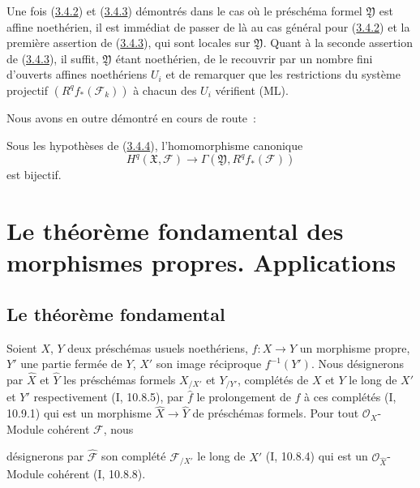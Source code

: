 \begin{env}[3.4.5]
Une fois (\hyperref[III.3.4.2-fr]{3.4.2}) et
(\hyperref[III.3.4.3-fr]{3.4.3}) démontrés dans le cas où le préschéma formel
$\mathfrak Y$ est affine noethérien, il est immédiat de passer de là au cas
général pour (\hyperref[III.3.4.2-fr]{3.4.2}) et la première assertion de
(\hyperref[III.3.4.3-fr]{3.4.3}), qui sont locales sur $\mathfrak Y$. Quant à
la seconde assertion de (\hyperref[III.3.4.3-fr]{3.4.3}), il suffit,
$\mathfrak Y$ étant noethérien, de le recouvrir par un nombre fini d'ouverts
affines noethériens $U_i$ et de remarquer que les restrictions du système
projectif $(R^qf_*(\mathcal F_k))$ à chacun des $U_i$ vérifient (ML).
\end{env}

Nous avons en outre démontré en cours de route~:

\begin{corollary}[3.4.6]
\label{III.3.4.6-fr}
Sous les hypothèses de (\hyperref[III.3.4.4-fr]{3.4.4}), l'homomorphisme
canonique
\[
H^q(\mathfrak X,\mathcal F)
\longrightarrow\Gamma(\mathfrak Y,R^qf_*(\mathcal F))
\tag{3.4.6.1}\label{III.3.4.6.1-fr}
\]
est bijectif.
\end{corollary}

\section{Le théorème fondamental des morphismes propres. Applications}
\label{section:III.4-fr}

\subsection{Le théorème fondamental}
\label{subsection:III.4.1-fr}

\begin{env}[4.1.1]
\label{III.4.1.1-fr}
Soient $X$, $Y$ deux préschémas usuels noethériens, $f:X\to Y$ un
morphisme propre, $Y'$ une partie fermée de $Y$, $X'$ son image réciproque
$f^{-1}(Y')$. Nous désignerons par $\widehat X$ et $\widehat Y$ les
préschémas formels $X_{/X'}$ et $Y_{/Y'}$, complétés de $X$ et $Y$ le long
de $X'$ et $Y'$ respectivement (I, 10.8.5), par $\widehat f$ le prolongement
de $f$ à ces complétés (I, 10.9.1) qui est un morphisme
$\widehat X\to\widehat Y$ de préschémas formels. Pour tout
$\mathcal O_X$-Module cohérent $\mathcal F$, nous


désignerons par $\widehat{\mathcal F}$ son complété $\mathcal F_{/X'}$ le
long de $X'$ (I, 10.8.4) qui est un $\mathcal O_{\widehat X}$-Module
cohérent (I, 10.8.8).
\end{env}

